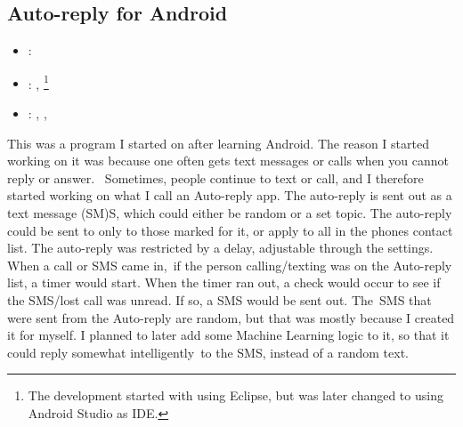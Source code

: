 \subsection{Auto-reply for Android}
\label{sec:auto_reply_android}
\begin{itemize} 
	\item {}: 
	\item {}: , \footnote{
		The development started with using Eclipse, but was later changed to using Android Studio as IDE.
	}
	\item {}: , , 
\end{itemize} 
This was a program I started on after learning Android. 
The reason I started working on it was because one often gets text messages or calls when you cannot reply or answer. 
Sometimes, people continue to text or call, and I therefore started working on what I call an Auto-reply app. 
The auto-reply is sent out as a text message (SM)S, which could either be random or a set topic.
\vspace{0.5em}\newline
The auto-reply could be sent to only to those marked for it, or apply to all in the phones contact list. 
The auto-reply was restricted by a delay, adjustable through the settings. 
When a call or SMS came in, if the person calling/texting was on the Auto-reply list, a timer would start. 
When the timer ran out, a check would occur to see if the SMS/lost call was unread. If so, a SMS would be sent out. 
\vspace{0.5em}\newline
The SMS that were sent from the Auto-reply are random, but that was mostly because I created it for myself. 
I planned to later add some Machine Learning logic to it, so that it could reply somewhat intelligently to the SMS, instead of a random text.
\vspace{0.5em}\newline
